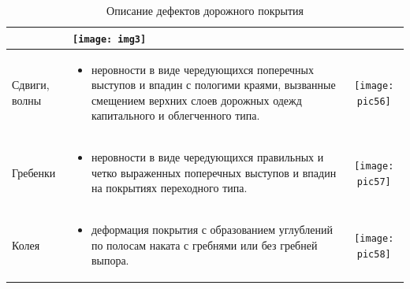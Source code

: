 \documentclass[a4paper,14pt]{extreport}
\begin{document}
\begin{table}[h!]
\begin{tabular}{ | m{2cm} | m{9cm} | c |  }
\begin{itemize}
      \end{itemize}
			&
			 \begin{minipage}{.3\textwidth}
			\centering
      \texttt{[image: img3]}
    \end{minipage}
    \\ \hline
	  Сдвиги, волны
    & 
\begin{itemize}
	\item  неровности в виде чередующихся поперечных выступов и впадин с пологими краями, вызванные смещением верхних слоев дорожных одежд капитального и облегченного типа.
\end{itemize}

			&
			 \begin{minipage}{.3\textwidth}
			\centering
      \texttt{[image: pic56]}
    \end{minipage}
    \\ \hline
	  Гребенки
    & 

\begin{itemize}
	\item  неровности в виде чередующихся правильных и четко выраженных поперечных выступов и впадин на покрытиях переходного типа.
\end{itemize}

			&
			 \begin{minipage}{.3\textwidth}
			\centering
      \texttt{[image: pic57]}
    \end{minipage}
    \\ \hline
	  Колея
    & 

\begin{itemize}
	\item  деформация покрытия с образованием углублений по полосам наката с гребнями или без гребней выпора.
\end{itemize}

			&
			 \begin{minipage}{.3\textwidth}
			\centering
      \texttt{[image: pic58]}
    \end{minipage}
    \\ \hline
  \end{tabular}
  \caption{Описание дефектов дорожного покрытия}\label{tab1}
\end{table}
\end{document}
